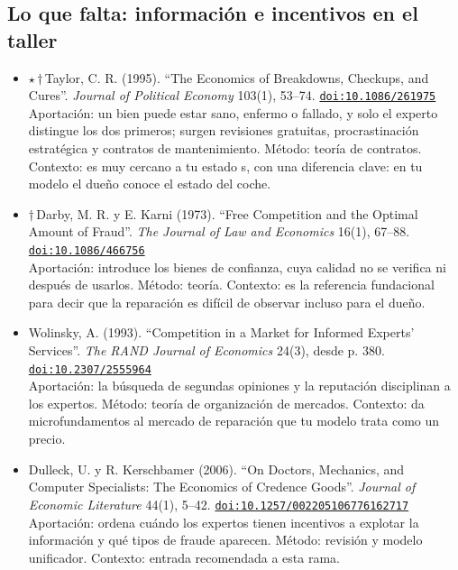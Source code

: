 \documentclass[11pt]{article}
\begin{document}
\subsection*{Lo que falta: información e incentivos en el taller}
\begin{itemize}
\item $\star$\,$\dagger$\,Taylor, C. R. (1995). ``The Economics of Breakdowns, Checkups, and Cures''. \textit{Journal of Political Economy} 103(1), 53--74. \href{https://doi.org/10.1086/261975}{\texttt{doi:10.1086/261975}}\\
Aportación: un bien puede estar sano, enfermo o fallado, y solo el experto distingue los dos primeros; surgen revisiones gratuitas, procrastinación estratégica y contratos de mantenimiento. Método: teoría de contratos. Contexto: es muy cercano a tu estado s, con una diferencia clave: en tu modelo el dueño conoce el estado del coche.
\item $\dagger$\,Darby, M. R. y E. Karni (1973). ``Free Competition and the Optimal Amount of Fraud''. \textit{The Journal of Law and Economics} 16(1), 67--88. \href{https://doi.org/10.1086/466756}{\texttt{doi:10.1086/466756}}\\
Aportación: introduce los bienes de confianza, cuya calidad no se verifica ni después de usarlos. Método: teoría. Contexto: es la referencia fundacional para decir que la reparación es difícil de observar incluso para el dueño.
\item Wolinsky, A. (1993). ``Competition in a Market for Informed Experts' Services''. \textit{The RAND Journal of Economics} 24(3), desde p. 380. \href{https://doi.org/10.2307/2555964}{\texttt{doi:10.2307/2555964}}\\
Aportación: la búsqueda de segundas opiniones y la reputación disciplinan a los expertos. Método: teoría de organización de mercados. Contexto: da microfundamentos al mercado de reparación que tu modelo trata como un precio.
\item Dulleck, U. y R. Kerschbamer (2006). ``On Doctors, Mechanics, and Computer Specialists: The Economics of Credence Goods''. \textit{Journal of Economic Literature} 44(1), 5--42. \href{https://doi.org/10.1257/002205106776162717}{\texttt{doi:10.1257/002205106776162717}}\\
Aportación: ordena cuándo los expertos tienen incentivos a explotar la información y qué tipos de fraude aparecen. Método: revisión y modelo unificador. Contexto: entrada recomendada a esta rama.

\end{itemize}
\end{document}
